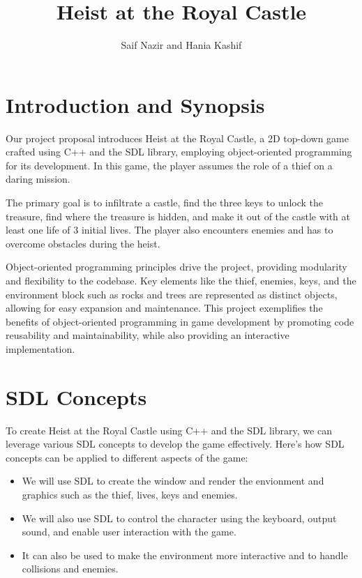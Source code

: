 \documentclass[12pt,a4paper]{article}
\title{Heist at the Royal Castle}
\author{Saif Nazir and Hania Kashif}
\begin{document}
\maketitle


\section{Introduction and Synopsis}\label{sec:intro}
Our project proposal introduces Heist at the Royal Castle, a 2D top-down game crafted using C++ and the SDL library, employing object-oriented programming for its development. In this game, the player assumes the role of a thief on a daring mission.

The primary goal is to infiltrate a castle, find the three keys to unlock the treasure, find where the treasure is hidden, and make it out of the castle with at least one life of 3 initial lives. The player also encounters enemies and has to overcome obstacles during the heist. 

Object-oriented programming principles drive the project, providing modularity and flexibility to the codebase. Key elements like the thief, enemies, keys, and the environment block such as rocks and trees are represented as distinct objects, allowing for easy expansion and maintenance. This project exemplifies the benefits of object-oriented programming in game development by promoting code reusability and maintainability, while also providing an interactive implementation.
\section{SDL Concepts}\label{sec:SDL concepts}
To create Heist at the Royal Castle using C++ and the SDL library, we can leverage various SDL concepts to develop the game effectively. Here's how SDL concepts can be applied to different aspects of the game:
\begin{itemize}
    \item We will use SDL to create the window and render the envionment and graphics such as the thief, lives, keys and enemies.
    \item We will also use SDL to control the character using the keyboard, output sound, and enable user interaction with the game.
    \item It can also be used to make the environment more interactive and to handle collisions and enemies.
\end{itemize}
\end{document}
